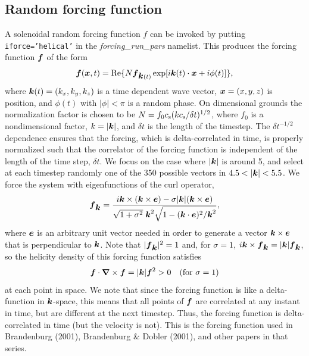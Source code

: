 \documentclass[\mydriver,12pt,twoside,notitlepage,a4paper]{article}
\makeatletter
\newcommand{\code}[1]{\texttt{#1}}
\newcommand{\name}[2][]{%
  \def\index@{#1}%
  \textsl{#2\/}%
  \ifx\index@\@empty\index{#2@\MakeUppercase #2}%
  \else\index{#1}%
  \fi%
}
\renewcommand{\vec}[1]{\mbox{\boldmath{$#1$}}}
\newcommand{\ev}            {\vec{e}}
\newcommand{\fv}            {\vec{f}}
\newcommand{\kv}            {\vec{k}}
\newcommand{\xv}            {\vec{x}}
\newcommand{\nab}{\mbox{\boldmath $\nabla$} {}}
\makeatother
\begin{document}

\subsection{Random forcing function}
\label{SRandomForcingFunction}

A solenoidal random forcing function $f$ can be invoked by putting
\code{iforce='helical'} in the \name{forcing_run_pars} namelist.
This produces the forcing function $\fv$ of the form
\begin{equation}
\fv(\xv,t)=\mbox{Re}\{N\fv_{\kv(t)}\exp[i\kv(t)\cdot\xv+i\phi(t)]\},
\end{equation}
where $\kv(t)=(k_x,k_y,k_z)$ is a time dependent wave vector,
$\xv=(x,y,z)$ is position, and $\phi(t)$ with $|\phi|<\pi$ is
a random phase. On dimensional grounds the normalization factor
is chosen to be
$N=f_0 c_{\rm s}(kc_{\rm s}/\delta t)^{1/2}$, where $f_0$ is a
nondimensional factor, $k=|\kv|$, and $\delta t$ is the length of
the timestep.
The $\delta t^{-1/2}$ dependence ensures that the forcing,
which is delta-correlated in time, is properly normalized such
that the correlator of the forcing function is independent of the
length of the time step, $\delta t$.
We focus on the case where $|\kv|$ is around 5, and
select at each timestep randomly one of the 350 possible vectors in
$4.5<|\kv|<5.5$. We force the system with eigenfunctions of the curl
operator,
\begin{equation}
\fv_{\kv}={i\kv\times(\kv\times\ev)-\sigma|\kv|(\kv\times\ev)
\over\sqrt{1+\sigma^2}\;\kv^2\sqrt{1-(\kv\cdot\ev)^2/\kv^2}},
\end{equation}
where $\ev$ is an arbitrary unit vector needed in order
to generate a vector $\kv\times\ev$ that is perpendicular
to $\kv$. Note that $|\fv_{\kv}|^2=1$ and, for $\sigma=1$,
$i\kv\times\fv_{\kv}=|\kv|\fv_{\kv}$, so the helicity density of this
forcing function satisfies
\begin{equation}
\fv\cdot\nab\times\fv=|\kv|\fv^2>0\quad(\mbox{for $\sigma=1$})
\end{equation}
at each point in space. We note that since the forcing function is like
a delta-function in $\kv$-space, this means that all points of $\fv$
are correlated at any instant in time, but are different at the next
timestep. Thus, the forcing function is delta-correlated in time (but
the velocity is not). This is the forcing function used in Brandenburg
(2001), Brandenburg \& Dobler (2001), and other papers in that series.
\end{document}

